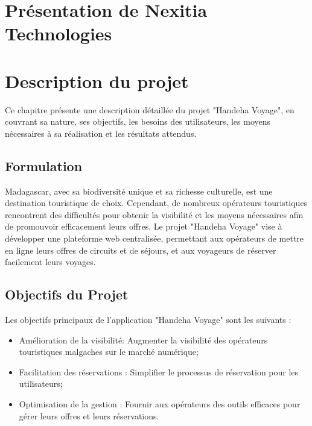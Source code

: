 \documentclass[12pt]{report}
\begin{document}
				\chapter{Présentation de Nexitia Technologies}
				
				\chapter{Description du projet}

				\hspace{15pt} Ce chapitre présente une description détaillée du projet "Handeha Voyage", en couvrant sa nature, ses objectifs, les besoins des utilisateurs, les moyens nécessaires à sa réalisation et les résultats attendus.

				\section{Formulation}
				
				\hspace{15pt} Madagascar, avec sa biodiversité unique et sa richesse culturelle, est une destination touristique de choix. Cependant, de nombreux opérateurs touristiques rencontrent des difficultés pour obtenir la visibilité et les moyens nécessaires afin de promouvoir efficacement leurs offres. Le projet "Handeha Voyage" vise à développer une plateforme web centralisée, permettant aux opérateurs de mettre en ligne leurs offres de circuits et de séjours, et aux voyageurs de réserver facilement leurs voyages.
	
				\section{Objectifs du Projet}

				\begin{center}
					\begin{minipage}{\textwidth}
						\hspace{15pt} Les objectifs principaux de l'application "Handeha Voyage" sont les suivants :
						\begin{itemize}
							\item Amélioration de la visibilité: Augmenter la visibilité des opérateurs touristiques malgaches sur le marché numérique;
							\item Facilitation des réservations : Simplifier le processus de réservation pour les utilisateurs;
							\item Optimisation de la gestion : Fournir aux opérateurs des outils efficaces pour gérer leurs offres et leurs réservations.
						\end{itemize}
					\end{minipage}					
				\end{center}
\end{document}
